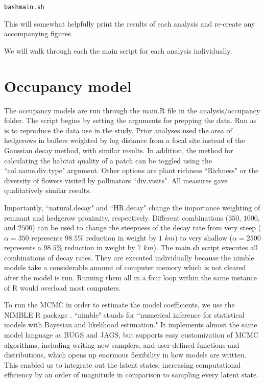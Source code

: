 \documentclass{article}\usepackage[]{graphicx}\usepackage[]{color}
\makeatletter
\newenvironment{kframe}{%
 \def\at@end@of@kframe{}%
 \ifinner\ifhmode%
  \def\at@end@of@kframe{\end{minipage}}%
  \begin{minipage}{\columnwidth}%
 \fi\fi%
 \def\FrameCommand##1{\hskip\@totalleftmargin \hskip-\fboxsep
 \colorbox{shadecolor}{##1}\hskip-\fboxsep
     \hskip-\linewidth \hskip-\@totalleftmargin \hskip\columnwidth}%
 \MakeFramed {\advance\hsize-\width
   \@totalleftmargin\z@ \linewidth\hsize
   \@setminipage}}%
 {\par\unskip\endMakeFramed%
 \at@end@of@kframe}
\newenvironment{knitrout}{}{} %
\makeatother
\begin{document}
\begin{knitrout}
\color{fgcolor}\begin{kframe}
\begin{alltt}
bash main.sh
\end{alltt}
\end{kframe}
\end{knitrout}

This will somewhat helpfully print the results of each analysis
and re-create any accompanying figures.

We will walk through each the main script for each analysis
individually.

\section{Occupancy model}

The occupancy models are run through the main.R file in the
analysis/occupancy folder. The script begins by setting the arguments
for prepping the data. Run as is to reproduce the data use in the
study. Prior analyses used the area of hedgerows in buffers weighted
by log distance from a focal site instead of the Gaussian decay
method, with similar results. In addition, the method for calculating
the habitat quality of a patch can be toggled using the ``col.name.div.type" argument. Other options are plant richness
``Richness" or the diversity of flowers visited by pollinators
``div.visits". All measures gave qualitatively similar results.

Importantly, ``natural.decay" and ``HR.decay" change the importance
weighting of remnant and hedgerow proximity, respectively. Different
combinations ($350$, $1000$, and $2500$) can be used to change the
steepness of the decay rate from very steep ($\alpha=350$ represents
$98.5\%$ reduction in weight by $1$ $km$) to very shallow
($\alpha=2500$ represents a $98.5\%$ reduction in weight by $7$
$km$). The main.sh script executes all combinations of decay
rates. They are executed individually because the nimble models take a
considerable amount of computer memory which is not cleared after the
model is run. Running them all in a four loop within the same instance
of R would overload most computers.

To run the MCMC in order to estimate the model coefficients, we use the
NIMBLE R package \citep{nimble-14, de2017programming}.  ``nimble"
stands for ``numerical inference for statistical models with Bayesian
and likelihood estimation."  It implements almost the same model
language as BUGS and JAGS, but supports easy customization of MCMC
algorithms, including writing new samplers, and user-defined functions
and distributions, which opens up enormous flexibility in how models
are written. This enabled us to integrate out the latent states,
increasing computational efficiency by an order of magnitude in
comparison to sampling every latent state. 
\end{document}
